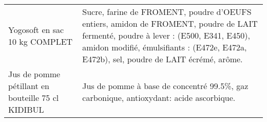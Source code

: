 \begin{longtable}{p{5cm}p{10cm}}
                                                                            Yogosoft en sac 10 kg COMPLET &                                                                                                                                                                                                                                                                                                                                                                                                                                                                                                                                                                                                                                                                                                                                                                                                              Sucre, farine de FROMENT, poudre d'OEUFS entiers, amidon de FROMENT, poudre de LAIT fermenté, poudre à lever : (E500, E341, E450), amidon modifié, émulsifiants : (E472e, E472a, E472b), sel, poudre de LAIT écrémé, arôme. \\
                                                        Jus de pomme pétillant en bouteille 75 cl KIDIBUL &                                                                                                                                                                                                                                                                                                                                                                                                                                                                                                                                                                                                                                                                                                                                                                                                                                                                                                                                                   Jus de pomme à base de concentré 99.5\%, gaz carbonique, antioxydant: acide ascorbique. \\

\end{longtable}
